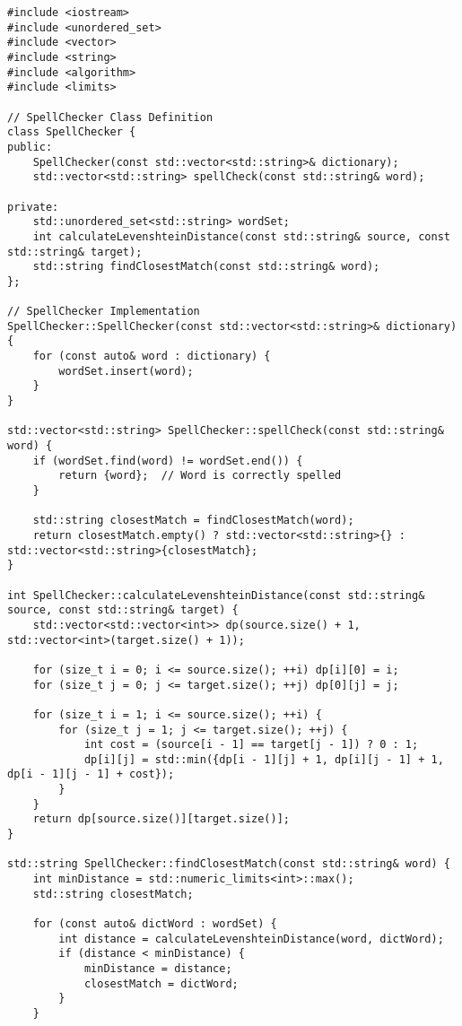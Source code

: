 \documentclass{article}
\begin{document}
\begin{lstlisting}[caption={main.cpp}, label={lst:main}]
#include <iostream>
#include <unordered_set>
#include <vector>
#include <string>
#include <algorithm>
#include <limits>

// SpellChecker Class Definition
class SpellChecker {
public:
    SpellChecker(const std::vector<std::string>& dictionary);
    std::vector<std::string> spellCheck(const std::string& word);

private:
    std::unordered_set<std::string> wordSet;
    int calculateLevenshteinDistance(const std::string& source, const std::string& target);
    std::string findClosestMatch(const std::string& word);
};

// SpellChecker Implementation
SpellChecker::SpellChecker(const std::vector<std::string>& dictionary) {
    for (const auto& word : dictionary) {
        wordSet.insert(word);
    }
}

std::vector<std::string> SpellChecker::spellCheck(const std::string& word) {
    if (wordSet.find(word) != wordSet.end()) {
        return {word};  // Word is correctly spelled
    }
    
    std::string closestMatch = findClosestMatch(word);
    return closestMatch.empty() ? std::vector<std::string>{} : std::vector<std::string>{closestMatch};
}

int SpellChecker::calculateLevenshteinDistance(const std::string& source, const std::string& target) {
    std::vector<std::vector<int>> dp(source.size() + 1, std::vector<int>(target.size() + 1));

    for (size_t i = 0; i <= source.size(); ++i) dp[i][0] = i;
    for (size_t j = 0; j <= target.size(); ++j) dp[0][j] = j;

    for (size_t i = 1; i <= source.size(); ++i) {
        for (size_t j = 1; j <= target.size(); ++j) {
            int cost = (source[i - 1] == target[j - 1]) ? 0 : 1;
            dp[i][j] = std::min({dp[i - 1][j] + 1, dp[i][j - 1] + 1, dp[i - 1][j - 1] + cost});
        }
    }
    return dp[source.size()][target.size()];
}

std::string SpellChecker::findClosestMatch(const std::string& word) {
    int minDistance = std::numeric_limits<int>::max();
    std::string closestMatch;

    for (const auto& dictWord : wordSet) {
        int distance = calculateLevenshteinDistance(word, dictWord);
        if (distance < minDistance) {
            minDistance = distance;
            closestMatch = dictWord;
        }
    }
    

\end{lstlisting}
\end{document}
